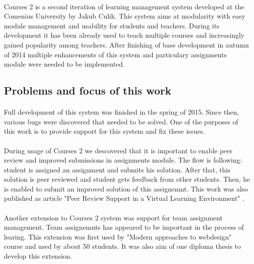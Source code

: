 \paragraph{}
Courses 2 is a second iteration of learning management system developed at the Comenius University by Jakub Culik.  This system aims at modularity with easy module management and usability for students and teachers. During its development it has been already used to teach multiple courses and increasingly gained popularity among teachers. After finishing of base development in autumn of 2014 multiple enhancements of this system and particulary assignments module were needed to be implemented.


\subsection{Problems and focus of this work}

\paragraph{}
Full development of this system was finished in the spring of 2015. Since then, various bugs were discovered that needed to be solved. One of the purposes of this work is to provide support for this system and fix these issues.

\paragraph{}
During usage of Courses 2 we descovered that it is important to enable peer review and improved submissions in assignments module. The flow is following: student is assigned an assignment and submits his solution. After that, this solution is peer reviewed and student gets feedback from other students. Then, he is enabled to submit an improved solution of this assignemnt. This work was also published as article "Peer Review Support in a Virtual Learning Environment"  \cite{homola2016peer}.

\paragraph{}
Another extension to Courses 2 system was support for team assignment management. Team assignemnts has appeared to be important in the process of learing. This extension was first used by "Modern approaches to webdesign" course and used by about 50 students. It was also aim of one diploma thesis to develop this extension.

